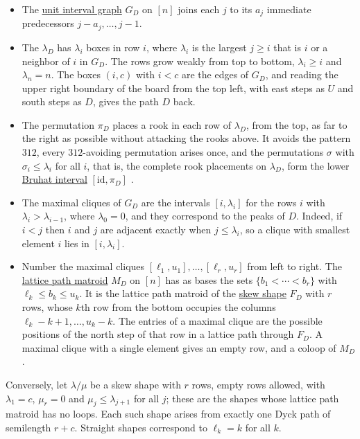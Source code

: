 \begin{itemize}
\item The \hyperref[unitIntervalGraph]{unit interval graph} $G_D$ on $[n]$
  joins each $j$ to its $a_j$ immediate predecessors $j-a_j,\dotsc,j-1$.
\item The \label{dyckPathFerrersBoard} $\lambda_D$ has
  $\lambda_i$ boxes in row $i$, where $\lambda_i$ is the largest $j\geq i$ that
  is $i$ or a neighbor of $i$ in $G_D$.  The rows grow weakly from top to
  bottom, $\lambda_i\geq i$ and $\lambda_n=n$.  The boxes $(i,c)$ with $i<c$
  are the edges of $G_D$, and reading the upper right boundary of the board
  from the top left, with east steps as $U$ and south steps as $D$, gives the
  path $D$ back.
\item The permutation $\pi_D$ places a rook in each row of $\lambda_D$, from
  the top, as far to the right as possible without attacking the rooks above.
  It avoids the pattern $312$, every $312$-avoiding permutation arises once,
  and the permutations $\sigma$ with $\sigma_i\leq\lambda_i$ for all $i$, that
  is, the complete rook placements on $\lambda_D$, form the lower
  \hyperref[bruhatOrder]{Bruhat interval} $[\mathrm{id},\pi_D]$
  \cite[Prop.~3]{AlexanderssonJalQuemener2025x}.
\item The maximal cliques\label{dyckPathPeakIntervals} of $G_D$ are the
  intervals $[i,\lambda_i]$ for the rows $i$ with $\lambda_i>\lambda_{i-1}$,
  where $\lambda_0=0$, and they correspond to the peaks of $D$.  Indeed, if
  $i<j$ then $i$ and $j$ are adjacent exactly when $j\leq\lambda_i$, so a
  clique with smallest element $i$ lies in $[i,\lambda_i]$.
\item Number the maximal cliques $[\ell_1,u_1],\dotsc,[\ell_r,u_r]$ from left to
  right.  The \hyperref[latticePathMatroids]{lattice path matroid} $M_D$ on
  $[n]$ has as bases the sets $\{b_1<\dotsb<b_r\}$ with
  $\ell_k\leq b_k\leq u_k$.  It is the lattice path matroid of the
  \hyperref[skewShapes]{skew shape} $F_D$ with $r$ rows, whose $k$th row from
  the bottom occupies the columns $\ell_k-k+1,\dotsc,u_k-k$.  The entries of a
  maximal clique are the possible positions of the north step of that row in a
  lattice path through $F_D$.  A maximal clique with a single element gives an
  empty row, and a coloop of $M_D$.
\end{itemize}

Conversely, let $\lambda/\mu$ be a skew shape with $r$ rows, empty rows
allowed, with $\lambda_1=c$, $\mu_r=0$ and $\mu_j\leq\lambda_{j+1}$ for all
$j$; these are the shapes whose lattice path matroid has no loops.  Each such
shape arises from exactly one Dyck path of semilength $r+c$.  Straight shapes
correspond to $\ell_k=k$ for all $k$.

